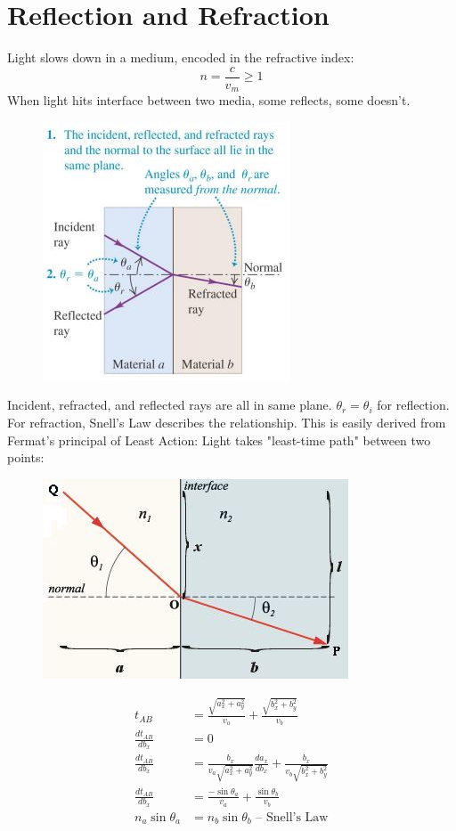 \documentclass[a4paper, 11pt, normalem]{report}
\begin{document}
\section{Reflection and Refraction}
Light slows down in a medium, encoded in the refractive index:
\begin{equation}
    n = \frac{c}{v_{m}} \geq 1
\end{equation}
When light hits interface between two media, some reflects, some doesn't.
\begin{figure}[H]
    \centering
    \includegraphics[scale=0.8]{Incidence.jpg} 
\end{figure}
Incident, refracted, and reflected rays are all in same plane.
$\theta_{r} = \theta_{i}$ for reflection.
For refraction, Snell's Law describes the relationship.
This is easily derived from Fermat's principal of Least Action: Light takes "least-time path" between two points:
\begin{figure}[H]
    \centering
    \includegraphics[scale=0.9]{Fermat.jpg}
\end{figure}
\begin{align}
    t_{AB} &= \frac{\sqrt{a_{x}^{2} + a_{y}^{2}}}{v_{a}} + \frac{\sqrt{b_{x}^{2} + b_{y}^{2}}}{v_{b}} \\
    \frac{dt_{AB}}{db_{x}} &= 0 \\
    \frac{dt_{AB}}{db_{x}} &= \frac{b_{x}}{v_{a}\sqrt{a_{x}^{2} + a_{y}^{2}}}\frac{da_{x}}{db_{x}} + \frac{b_{x}}{v_{b}\sqrt{b_{x}^{2} + b_{y}^{2}}} \\
    \frac{dt_{AB}}{db_{x}} &= \frac{-\sin{\theta_{a}}}{v_{a}} + \frac{\sin{\theta_{b}}}{v_{b}} \\
    n_{a}\sin{\theta_{a}} &= n_{b}\sin{\theta_{b}}\text{ -- Snell's Law}
\end{align}
\end{document}
